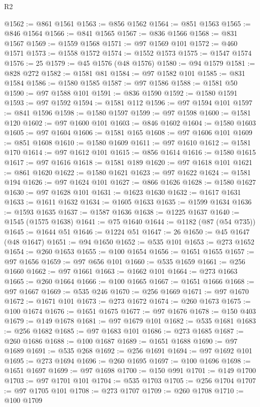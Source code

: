 \begin{lexlean}{R2}
\begin{coremodule}
@1562 := @861 @1561
@1563 := @856 @1562
@1564 := @851 @1563
@1565 := @846 @1564
@1566 := @841 @1565
@1567 := @836 @1566
@1568 := @831 @1567
@1569 := @1559 @1568
@1571 := @97 @1569 @101
@1572 := @460 @1571
@1573 := @1558 @1572
@1574 := @1552 @1573
@1575 := @1547 @1574
@1576 := 25
@1579 := @45 @1576 (@48 @1576)
@1580 := @94 @1579
@1581 := @828 @272
@1582 := @1581 @81
@1584 := @97 @1582 @101
@1585 := @831 @1584
@1586 := @1580 @1585
@1587 := @97 @1586
@1588 := @1581 @50
@1590 := @97 @1588 @101
@1591 := @836 @1590
@1592 := @1580 @1591
@1593 := @97 @1592
@1594 := @1581 @112
@1596 := @97 @1594 @101
@1597 := @841 @1596
@1598 := @1580 @1597
@1599 := @97 @1598
@1600 := @1581 @120
@1602 := @97 @1600 @101
@1603 := @846 @1602
@1604 := @1580 @1603
@1605 := @97 @1604
@1606 := @1581 @165
@1608 := @97 @1606 @101
@1609 := @851 @1608
@1610 := @1580 @1609
@1611 := @97 @1610
@1612 := @1581 @170
@1614 := @97 @1612 @101
@1615 := @856 @1614
@1616 := @1580 @1615
@1617 := @97 @1616
@1618 := @1581 @189
@1620 := @97 @1618 @101
@1621 := @861 @1620
@1622 := @1580 @1621
@1623 := @97 @1622
@1624 := @1581 @194
@1626 := @97 @1624 @101
@1627 := @866 @1626
@1628 := @1580 @1627
@1630 := @97 @1628 @101
@1631 := @1623 @1630
@1632 := @1617 @1631
@1633 := @1611 @1632
@1634 := @1605 @1633
@1635 := @1599 @1634
@1636 := @1593 @1635
@1637 := @1587 @1636
@1638 := @1225 @1637
@1640 := @1545 (@1575 @1638)
@1641 := @75 @1640
@1644 := @1182 (@87 (@54 @735))
@1645 := @1644 @51
@1646 := @1224 @51
@1647 := 26
@1650 := @45 @1647 (@48 @1647)
@1651 := @94 @1650
@1652 := @535 @101
@1653 := @273 @1652
@1654 := @260 @1653
@1655 := @100 @1654
@1656 := @1651 @1655
@1657 := @97 @1656
@1659 := @97 @656 @101
@1660 := @535 @1659
@1661 := @256 @1660
@1662 := @97 @1661
@1663 := @1662 @101
@1664 := @273 @1663
@1665 := @260 @1664
@1666 := @100 @1665
@1667 := @1651 @1666
@1668 := @97 @1667
@1669 := @535 @246
@1670 := @256 @1669
@1671 := @97 @1670
@1672 := @1671 @101
@1673 := @273 @1672
@1674 := @260 @1673
@1675 := @100 @1674
@1676 := @1651 @1675
@1677 := @97 @1676
@1678 := @150 @403
@1679 := @149 @1678
@1681 := @97 @1679 @101
@1682 := @535 @1681
@1683 := @256 @1682
@1685 := @97 @1683 @101
@1686 := @273 @1685
@1687 := @260 @1686
@1688 := @100 @1687
@1689 := @1651 @1688
@1690 := @97 @1689
@1691 := @535 @268
@1692 := @256 @1691
@1694 := @97 @1692 @101
@1695 := @273 @1694
@1696 := @260 @1695
@1697 := @100 @1696
@1698 := @1651 @1697
@1699 := @97 @1698
@1700 := @150 @991
@1701 := @149 @1700
@1703 := @97 @1701 @101
@1704 := @535 @1703
@1705 := @256 @1704
@1707 := @97 @1705 @101
@1708 := @273 @1707
@1709 := @260 @1708
@1710 := @100 @1709

\end{coremodule}
\end{lexlean}
